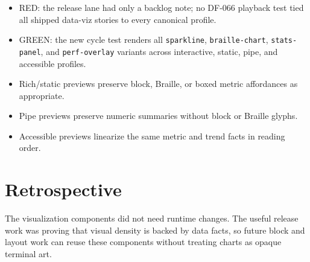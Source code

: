 \begin{itemize}
\tightlist
\item
  RED: the release lane had only a backlog note; no DF-066 playback test tied all shipped data-viz stories to every canonical profile.
\item
  GREEN: the new cycle test renders all \texttt{s\allowbreak{}p\allowbreak{}a\allowbreak{}r\allowbreak{}k\allowbreak{}l\allowbreak{}i\allowbreak{}n\allowbreak{}e}, \texttt{b\allowbreak{}r\allowbreak{}a\allowbreak{}i\allowbreak{}l\allowbreak{}l\allowbreak{}e\allowbreak{}-\allowbreak{}c\allowbreak{}h\allowbreak{}a\allowbreak{}r\allowbreak{}t}, \texttt{s\allowbreak{}t\allowbreak{}a\allowbreak{}t\allowbreak{}s\allowbreak{}-\allowbreak{}p\allowbreak{}a\allowbreak{}n\allowbreak{}e\allowbreak{}l}, and \texttt{p\allowbreak{}e\allowbreak{}r\allowbreak{}f\allowbreak{}-\allowbreak{}o\allowbreak{}v\allowbreak{}e\allowbreak{}r\allowbreak{}l\allowbreak{}a\allowbreak{}y} variants across interactive, static, pipe, and accessible profiles.
\item
  Rich/static previews preserve block, Braille, or boxed metric affordances as appropriate.
\item
  Pipe previews preserve numeric summaries without block or Braille glyphs.
\item
  Accessible previews linearize the same metric and trend facts in reading order.
\end{itemize}

\section{Retrospective}\label{record-107-retrospective}

The visualization components did not need runtime changes. The useful release work was proving that visual density is backed by data facts, so future block and layout work can reuse these components without treating charts as opaque terminal art.

